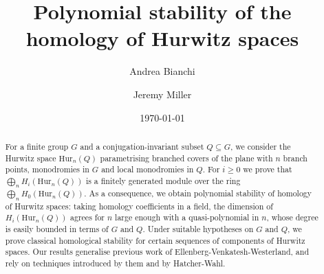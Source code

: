 \documentclass{amsart}
\theoremstyle{plain}
\theoremstyle{definition}
\begin{document}
\title[Polynomial stability of Hurwitz spaces]{Polynomial stability of the homology of Hurwitz spaces}

\author{Andrea Bianchi}
\address{Department of Mathematical Sciences, University of Copenhagen \newline
Universitetsparken 5, Copenhagen, 2100, Denmark}  

 \author{Jeremy Miller}
\address{Purdue University, Department of Mathematics North University, West Lafayette IN, 47907, USA}



\date{\today}

\begin{abstract}
For a finite group $G$ and a conjugation-invariant subset $Q\subseteq G$, we consider the Hurwitz space $\mathrm{Hur}_n(Q)$ parametrising branched covers of the plane with $n$ branch points, monodromies in $G$ and local monodromies in $Q$. For $i\ge0$ we prove that $\bigoplus_n H_i(\mathrm{Hur}_n(Q))$ is a finitely generated module over the ring $\bigoplus_n H_0(\mathrm{Hur}_n(Q))$. As a consequence, we obtain polynomial stability of homology of Hurwitz spaces: taking homology coefficients in a field, the dimension of $H_i(\mathrm{Hur}_n(Q))$ agrees for $n$ large enough with a quasi-polynomial in $n$, whose degree is easily bounded in terms of $G$ and $Q$. Under suitable hypotheses on $G$ and $Q$, we prove classical homological stability for certain sequences of components of Hurwitz spaces.
Our results generalise previous work of Ellenberg-Venkatesh-Westerland, and rely on techniques introduced by them and by Hatcher-Wahl.
\end{abstract}

\maketitle
 











\end{document}
